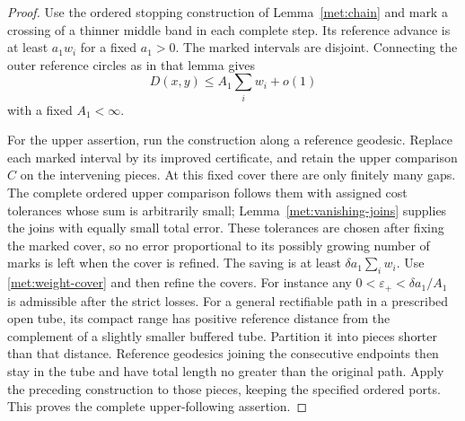 \documentclass[11pt]{article}
\numberwithin{equation}{section}
\theoremstyle{definition}
\theoremstyle{remark}
\newcommand{\1}{\mathbf 1}
\begin{document}
\begin{proof}
Use the ordered stopping construction of Lemma~\ref{met:chain} and
mark a crossing of a thinner middle band in each complete step.  Its
reference advance is at least $a_1w_i$ for a fixed $a_1>0$.
The marked intervals are disjoint.  Connecting the outer reference
circles as in that lemma gives
\begin{equation}
 D(x,y)\leq A_1\sum_iw_i+o(1)
 \label{met:weight-cover}
\end{equation}
with a fixed $A_1<\infty$.

For the upper assertion, run the construction along a reference
geodesic.  Replace each marked interval by its improved certificate,
and retain the upper comparison $C$ on the intervening pieces.
At this fixed cover there are only finitely many gaps.  The complete
ordered upper comparison follows them with assigned cost tolerances
whose sum is arbitrarily small; Lemma~\ref{met:vanishing-joins}
supplies the joins with equally small total error.  These tolerances
are chosen after fixing the marked cover, so no error proportional
to its possibly growing number of marks is left when the cover is
refined.  The saving is at least
$\delta a_1\sum_iw_i$.  Use \eqref{met:weight-cover} and then refine
the covers.  For instance any
$0<\varepsilon_+<\delta a_1/A_1$ is admissible after the strict losses.
For a general rectifiable path in a prescribed open tube, its compact
range has positive reference distance from the complement of a
slightly smaller buffered tube.  Partition it into pieces shorter
than that distance.  Reference geodesics joining the consecutive
endpoints then stay in the tube and have total length no greater
than the original path.  Apply the preceding construction to those
pieces, keeping the specified ordered ports.  This proves the
complete upper-following assertion.


\end{proof}
\end{document}
